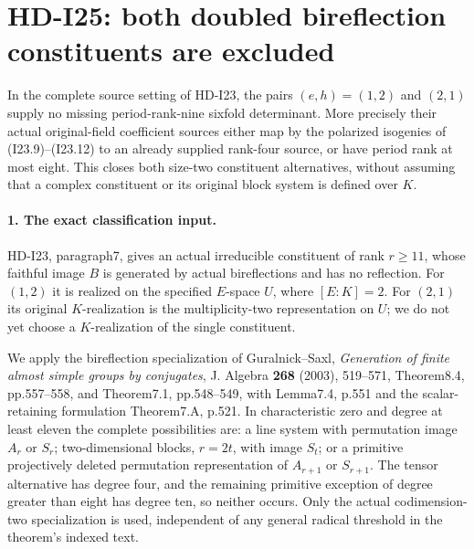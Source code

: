 \section{HD-I25: both doubled bireflection constituents are excluded}
\label{sec:rank-four-double-constituents}

In the complete source setting of HD-I23, the pairs
\((e,h)=(1,2)\) and \((2,1)\) supply no missing period-rank-nine
sixfold determinant. More precisely their actual original-field
coefficient sources either map by the polarized isogenies of
(I23.9)--(I23.12) to an already supplied rank-four source, or
have period rank at most eight. This closes both size-two
constituent alternatives, without assuming that a complex
constituent or its original block system is defined over \(K\).

\paragraph{1. The exact classification input.}
HD-I23, paragraph7, gives an actual irreducible constituent of
rank \(r\ge11\), whose faithful image \(B\) is generated by
actual bireflections and has no reflection. For \((1,2)\) it is
realized on the specified \(E\)-space \(U\), where
\([E:K]=2\). For \((2,1)\) its original \(K\)-realization is
the multiplicity-two representation on \(U\); we do not yet
choose a \(K\)-realization of the single constituent.

We apply the bireflection specialization of Guralnick--Saxl,
\emph{Generation of finite almost simple groups by conjugates},
J. Algebra \textbf{268} (2003), 519--571, Theorem8.4,
pp.557--558, and Theorem7.1, pp.548--549, with Lemma7.4,
p.551 and the scalar-retaining formulation Theorem7.A, p.521.
In characteristic zero and degree at least eleven the complete
possibilities are: a line system with permutation image \(A_r\)
or \(S_r\); two-dimensional blocks, \(r=2t\), with image
\(S_t\); or a primitive projectively deleted permutation
representation of \(A_{r+1}\) or \(S_{r+1}\).
The tensor alternative has degree four, and the remaining
primitive exception of degree greater than eight has degree
ten, so neither occurs. Only the actual codimension-two
specialization is used, independent of any general radical
threshold in the theorem's indexed text.


